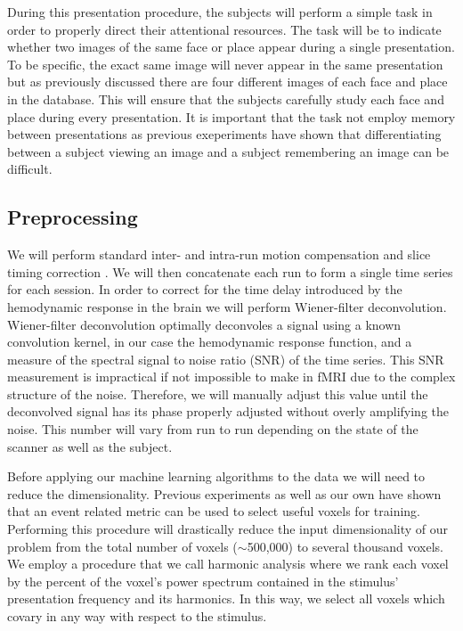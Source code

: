 \documentclass[12pt]{article}
\begin{document}
During this presentation procedure, the subjects will perform a simple task in order to properly direct their attentional resources.
The task will be to indicate whether two images of the same face or place appear during a single presentation.
To be specific, the exact same image will never appear in the same presentation but as previously discussed there are four different images of each face and place in the database.
This will ensure that the subjects carefully study each face and place during every presentation.
It is important that the task not employ memory between presentations as previous exeperiments \cite{Lewis-Peacock2012} have shown that differentiating between a subject viewing an image and a subject remembering an image can be difficult.

\subsection{Preprocessing}
We will perform standard inter- and intra-run motion compensation and slice timing correction \cite{Nestares2000}.
We will then concatenate each run to form a single time series for each session.
In order to correct for the time delay introduced by the hemodynamic response in the brain we will perform Wiener-filter deconvolution.
Wiener-filter deconvolution optimally deconvoles a signal using a known convolution kernel, in our case the hemodynamic response function, and a measure of the spectral signal to noise ratio (SNR) of the time series.
This SNR measurement is impractical if not impossible to make in fMRI due to the complex structure of the noise.
Therefore, we will manually adjust this value until the deconvolved signal has its phase properly adjusted without overly amplifying the noise.
This number will vary from run to run depending on the state of the scanner as well as the subject.

Before applying our machine learning algorithms to the data we will need to reduce the dimensionality.
Previous experiments \cite{Pereira2009} as well as our own have shown that an event related metric can be used to select useful voxels for training.
Performing this procedure will drastically reduce the input dimensionality of our problem from the total number of voxels ($\sim$500,000) to several thousand voxels.
We employ a procedure that we call harmonic analysis where we rank each voxel by the percent of the voxel's power spectrum contained in the stimulus' presentation frequency and its harmonics.
In this way, we select all voxels which covary in any way with respect to the stimulus.
\end{document}
